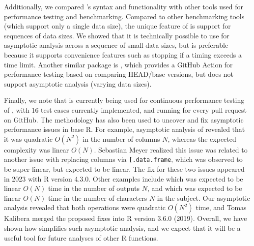 Additionally, we compared 's syntax and functionality with other tools used for performance testing and benchmarking. 
Compared to other benchmarking tools (which support only a single data size), the unique feature of  is support for sequences of data sizes. 
We showed that it is technically possible to use  for asymptotic analysis across a sequence of small data sizes, but  is preferable because it supports convenience features such as stopping if a timing exceeds a time limit.
Another similar package is , which provides a GitHub Action for performance testing based on comparing HEAD/base versions, but does not support asymptotic analysis (varying data sizes).

Finally, we note that  is currently being used for continuous performance testing of , with 16 test cases currently implemented, and running for every pull request on GitHub.
The  methodology has also been used to uncover and fix asymptotic performance issues in base R.
For example, asymptotic analysis of  revealed that it was quadratic $O(N^2)$ in the number of columns $N$, whereas the expected complexity was linear $O(N)$.
Sebastian Meyer realized this issue was related to another issue with replacing columns via \verb|[.data.frame|, which was observed to be super-linear, but expected to be linear.
The fix for these two issues appeared in 2023 with R version 4.3.0.
Other examples include  which was expected to be linear $O(N)$ time in the number of outputs $N$, and  which was expected to be linear $O(N)$ time in the number of characters $N$ in the subject. 
Our asymptotic analysis revealed that both operations were quadratic $O(N^2)$ time, and Tomas Kalibera merged the proposed fixes into R version 3.6.0 (2019).
Overall, we have shown how  simplifies such asymptotic analysis, and we expect that it will be a useful tool for future analyses of other R functions.



\newpage
